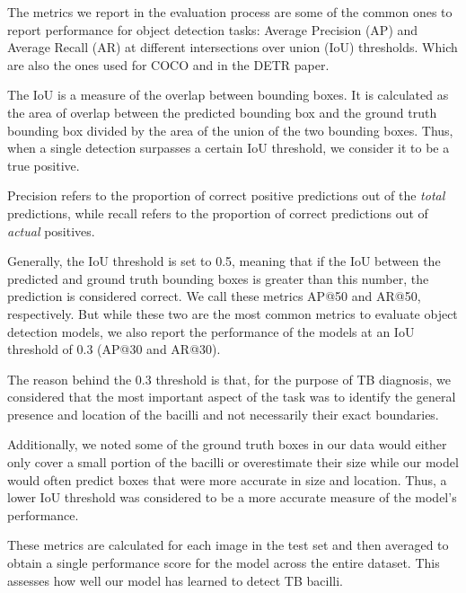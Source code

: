 \documentclass[../main.tex]{subfiles}
\begin{document}
    The metrics we report in the evaluation process are some of the common ones to report performance for object detection tasks: Average Precision (AP) and Average Recall (AR) at different intersections over union (IoU) thresholds. Which are also the ones used for COCO and in the DETR paper.

    The IoU is a measure of the overlap between bounding boxes. It is calculated as the area of overlap between the predicted bounding box and the ground truth bounding box divided by the area of the union of the two bounding boxes. Thus, when a single detection surpasses a certain IoU threshold, we consider it to be a true positive.

    Precision refers to the proportion of correct positive predictions out of 
    the \textit{total} predictions, while recall refers to the proportion of correct predictions out of \textit{actual} positives. 

    Generally, the IoU threshold is set to 0.5, meaning that if the IoU between the predicted and ground truth bounding boxes is greater than this number, the prediction is considered correct. We call these metrics AP@50 and AR@50, respectively. But while these two are the most common metrics to evaluate object detection models, we also report the performance of the models at an IoU threshold of 0.3 (AP@30 and AR@30). 
    
    The reason behind the 0.3 threshold is that, for the purpose of TB diagnosis, we considered that the most important aspect of the task was to identify the general presence and location of the bacilli and not necessarily their exact boundaries. 
    
    Additionally, we noted some of the ground truth boxes in our data would either only cover a small portion of the bacilli or overestimate their size while our model would often predict boxes that were more accurate in size and location. Thus, a lower IoU threshold was considered to be a more accurate measure of the model's performance.
      
    These metrics are calculated for each image in the test set and then averaged to obtain a single performance score for the model across the entire dataset. This assesses how well our model has learned to detect TB bacilli.

    \vspace{-0.5cm}
\end{document}
